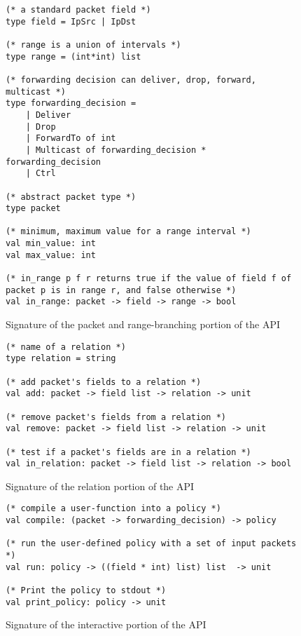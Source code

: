 \documentclass[12pt]{article}
\begin{document}
\begin{figure}
  \begin{lstlisting}
(* a standard packet field *)
type field = IpSrc | IpDst 

(* range is a union of intervals *)
type range = (int*int) list

(* forwarding decision can deliver, drop, forward, multicast *)
type forwarding_decision =
	| Deliver
	| Drop
	| ForwardTo of int
	| Multicast of forwarding_decision * forwarding_decision
	| Ctrl

(* abstract packet type *)
type packet

(* minimum, maximum value for a range interval *)
val min_value: int 
val max_value: int

(* in_range p f r returns true if the value of field f of packet p is in range r, and false otherwise *)
val in_range: packet -> field -> range -> bool
\end{lstlisting}

\caption{Signature of the packet and range-branching portion of the API}
\end{figure}


\begin{figure}
  \begin{lstlisting}
(* name of a relation *)
type relation = string

(* add packet's fields to a relation *)
val add: packet -> field list -> relation -> unit

(* remove packet's fields from a relation *)
val remove: packet -> field list -> relation -> unit

(* test if a packet's fields are in a relation *)
val in_relation: packet -> field list -> relation -> bool
\end{lstlisting}

\caption{Signature of the relation portion of the API}
\end{figure}

\begin{figure}
  \begin{lstlisting}
(* compile a user-function into a policy *)
val compile: (packet -> forwarding_decision) -> policy
    
(* run the user-defined policy with a set of input packets *)
val run: policy -> ((field * int) list) list  -> unit
    
(* Print the policy to stdout *)
val print_policy: policy -> unit
  \end{lstlisting}
  \caption{Signature of the interactive portion of the API}
\end{figure}
\end{document}
